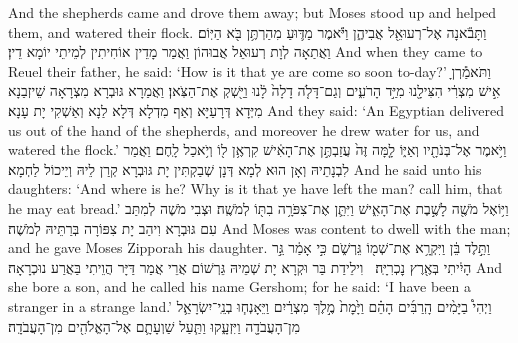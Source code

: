 {{And the shepherds came and drove them away; but Moses stood up and helped them, and watered their flock.}{}
{וַתָּבֹ֕אנָה אֶל־רְעוּאֵ֖ל אֲבִיהֶ֑ן וַיֹּ֕אמֶר מַדּ֛וּעַ מִהַרְתֶּ֥ן בֹּ֖א הַיּֽוֹם׃}
{וַאֲתַאָה לְוָת רְעוּאֵל אֲבוּהוֹן וַאֲמַר מָדֵין אוֹחִיתִין לְמֵיתֵי יוֹמָא דֵין׃}
{And when they came to Reuel their father, he said: ‘How is it that ye are come so soon to-day?’}{}
{וַתֹּאמַ֕רְןָ אִ֣ישׁ מִצְרִ֔י הִצִּילָ֖נוּ מִיַּ֣ד הָרֹעִ֑ים וְגַם־דָּלֹ֤ה דָלָה֙ לָ֔נוּ וַיַּ֖שְׁקְ אֶת־הַצֹּֽאן׃}
{וַאֲמַרָא גּוּבְרָא מִצְרָאָה שֵׁיזְבַנָא מִיְּדָא דְּרָעַיָּא וְאַף מִדְלָא דְּלָא לַנָא וְאַשְׁקִי יָת עָנָא׃}
{And they said: ‘An Egyptian delivered us out of the hand of the shepherds, and moreover he drew water for us, and watered the flock.’}{}
{וַיֹּ֥אמֶר אֶל־בְּנֹתָ֖יו וְאַיּ֑וֹ לָ֤מָּה זֶּה֙ עֲזַבְתֶּ֣ן אֶת־הָאִ֔ישׁ קִרְאֶ֥ן ל֖וֹ וְיֹ֥אכַל לָֽחֶם׃
}
{וַאֲמַר לִבְנָתֵיהּ וְאָן הוּא לְמָא דְּנָן שְׁבַקְתִּין יָת גּוּבְרָא קְרַן לֵיהּ וְיֵיכוֹל לַחְמָא׃}
{And he said unto his daughters: ‘And where is he? Why is it that ye have left the man? call him, that he may eat bread.’}{}
{וַיּ֥וֹאֶל מֹשֶׁ֖ה לָשֶׁ֣בֶת אֶת־הָאִ֑ישׁ וַיִּתֵּ֛ן אֶת־צִפֹּרָ֥ה בִתּ֖וֹ לְמֹשֶֽׁה׃
}
{וּצְבִי מֹשֶׁה לְמִתַּב עִם גּוּבְרָא וִיהַב יָת צִפּוֹרָה בְּרַתֵּיהּ לְמֹשֶׁה׃}
{And Moses was content to dwell with the man; and he gave Moses Zipporah his daughter.}{}
{וַתֵּ֣לֶד בֵּ֔ן וַיִּקְרָ֥א אֶת־שְׁמ֖וֹ גֵּרְשֹׁ֑ם כִּ֣י אָמַ֔ר גֵּ֣ר הָיִ֔יתִי בְּאֶ֖רֶץ נׇכְרִיָּֽה׃ \petucha }
{וִילֵידַת בַּר וּקְרָא יָת שְׁמֵיהּ גֵּרְשׁוֹם אֲרֵי אֲמַר דַּיָּר הֲוֵיתִי בַּאֲרַע נוּכְרָאָה׃}
{And she bore a son, and he called his name Gershom; for he said: ‘I have been a stranger in a strange land.’}{}
{וַיְהִי֩ בַיָּמִ֨ים הָֽרַבִּ֜ים הָהֵ֗ם וַיָּ֙מׇת֙ מֶ֣לֶךְ מִצְרַ֔יִם וַיֵּאָנְח֧וּ בְנֵֽי־יִשְׂרָאֵ֛ל מִן־הָעֲבֹדָ֖ה וַיִּזְעָ֑קוּ וַתַּ֧עַל שַׁוְעָתָ֛ם אֶל־הָאֱלֹהִ֖ים מִן־הָעֲבֹדָֽה׃
}
}
